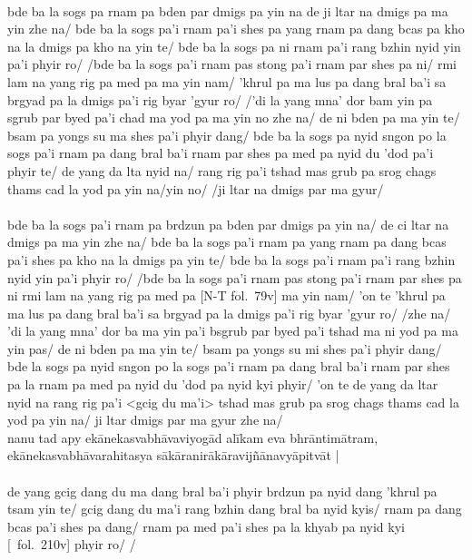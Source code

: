 \documentclass[12pt]{article}
\begin{document}
\textbf{\TVA}\\
bde ba la sogs pa rnam pa bden par dmigs pa yin na de ji ltar na dmigs pa ma yin zhe na/ bde ba la sogs pa'i rnam pa'i shes pa yang rnam pa dang bcas pa kho na la dmigs pa kho na yin te/ bde ba la sogs pa ni rnam pa'i rang bzhin nyid yin pa'i phyir ro/ /bde ba la sogs pa'i rnam pas stong pa'i rnam par shes pa ni/ rmi lam na yang rig pa med pa ma yin nam/ 'khrul pa ma lus pa dang bral ba'i sa brgyad pa la dmigs pa'i rig byar 'gyur ro/ /'di la yang mna' dor bam yin pa sgrub par byed pa'i chad ma yod pa ma yin no zhe na/ de ni bden pa ma yin te/ bsam pa yongs su ma shes pa'i phyir dang/ bde ba la sogs pa nyid sngon po la sogs pa'i rnam pa dang bral ba'i rnam par shes pa med pa nyid du 'dod pa'i phyir te/ de yang da lta nyid na/ rang rig pa'i tshad mas grub pa srog chags thams cad la yod pa yin na/yin no/ /ji ltar na dmigs par ma gyur/ \\

\textbf{\TVB}\\
bde ba la sogs pa'i rnam pa brdzun pa bden par dmigs pa yin na/ de ci ltar na dmigs pa ma yin zhe na/ bde ba la sogs pa'i rnam pa yang rnam pa dang bcas pa'i shes pa kho na la dmigs pa yin te/ bde ba la sogs pa'i rnam pa'i rang bzhin nyid yin pa'i phyir ro/ /bde ba la sogs pa'i rnam pas stong pa'i rnam par shes pa ni rmi lam na yang rig pa med pa [N-T fol.\ 79v] ma yin nam/ 'on te 'khrul pa ma lus pa dang bral ba'i sa brgyad pa la dmigs pa'i rig byar 'gyur ro/ /zhe na/ 'di la yang mna' dor ba ma yin pa'i bsgrub par byed pa'i tshad ma ni yod pa ma yin pas/ de ni bden pa ma yin te/ bsam pa yongs su mi shes pa'i phyir dang/ bde la sogs pa nyid sngon po la sogs pa'i rnam pa dang bral ba'i rnam par shes pa la rnam pa med pa nyid du 'dod pa nyid kyi phyir/ 'on te de yang da ltar nyid na rang rig pa'i <gcig du ma'i> tshad mas grub pa srog chags thams cad la yod pa yin na/ ji ltar dmigs par ma gyur zhe na/\\ 

nanu tad apy ekānekasvabhāvaviyogād alīkam eva bhrāntimātram, ekānekasvabhāvarahitasya sākāranirākāravijñānavyāpitvāt |\\

\textbf{\TVA}\\
de yang gcig dang du ma dang bral ba'i phyir brdzun pa nyid dang 'khrul pa tsam yin te/ gcig dang du ma'i rang bzhin dang bral ba nyid kyis/ rnam pa dang bcas pa'i shes pa dang/ rnam pa med pa'i shes pa la khyab pa nyid kyi [\TVA\ fol.\ 210v] phyir ro/ /\\
\end{document}
